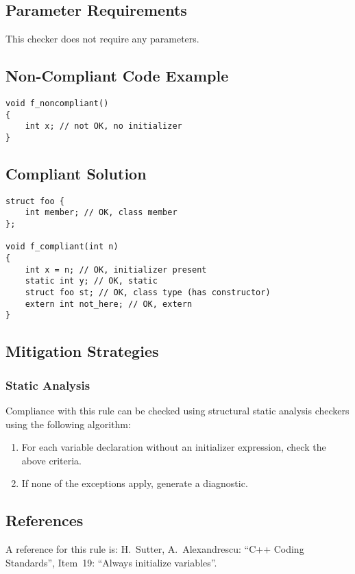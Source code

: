 \subsection{Parameter Requirements}

This checker does not require any parameters.

\subsection{Non-Compliant Code Example}

\begin{verbatim}
void f_noncompliant()
{
    int x; // not OK, no initializer
}
\end{verbatim}

\subsection{Compliant Solution}

\begin{verbatim}
struct foo {
    int member; // OK, class member
};

void f_compliant(int n)
{
    int x = n; // OK, initializer present
    static int y; // OK, static
    struct foo st; // OK, class type (has constructor)
    extern int not_here; // OK, extern
}
\end{verbatim}

\subsection{Mitigation Strategies}
\subsubsection{Static Analysis} 

Compliance with this rule can be checked using structural static analysis checkers using the following algorithm:

\begin{enumerate}
\item For each variable declaration without an initializer expression, check
the above criteria.
\item If none of the exceptions apply, generate a diagnostic.
\end{enumerate}

\subsection{References}

A reference for this rule is: H.~Sutter, A.~Alexandrescu: ``C++ Coding
Standards'', Item~19: ``Always initialize variables''.
